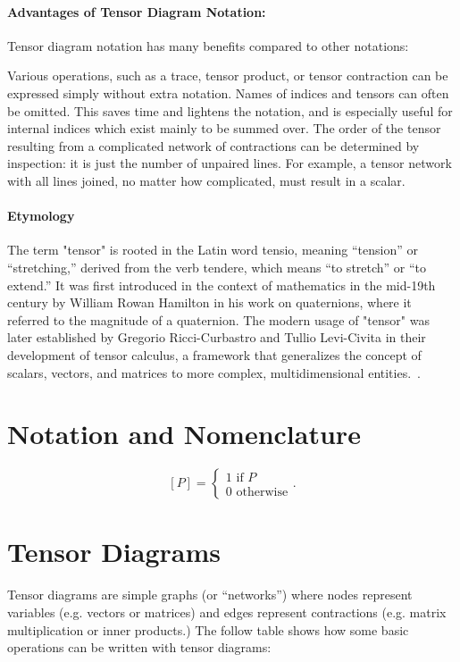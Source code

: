 \paragraph{Advantages of Tensor Diagram Notation:}
Tensor diagram notation has many benefits compared to other notations:

Various operations, such as a trace, tensor product, or tensor contraction can be expressed simply without extra notation.
Names of indices and tensors can often be omitted. This saves time and lightens the notation, and is especially useful for internal indices which exist mainly to be summed over.
The order of the tensor resulting from a complicated network of contractions can be determined by inspection: it is just the number of unpaired lines. For example, a tensor network with all lines joined, no matter how complicated, must result in a scalar.


\paragraph{Etymology}
The term "tensor" is rooted in the Latin word tensio, meaning ``tension'' or ``stretching,'' derived from the verb tendere, which means ``to stretch'' or ``to extend.''
It was first introduced in the context of mathematics in the mid-19th century by William Rowan Hamilton in his work on quaternions, where it referred to the magnitude of a quaternion.
The modern usage of "tensor" was later established by Gregorio Ricci-Curbastro and Tullio Levi-Civita in their development of tensor calculus, a framework that generalizes the concept of scalars, vectors, and matrices to more complex, multidimensional entities.~\cite{tensor_etymology_russo, hamilton_tensor}.


\tableofcontents
\clearpage

\section{Notation and Nomenclature}
\[
   [P] = \begin{cases}
      1 \text{ if } P \\
      0 \text{ otherwise}
   \end{cases}.
\]

\section{Tensor Diagrams}
Tensor diagrams are simple graphs (or ``networks'') where
nodes represent variables (e.g. vectors or matrices) and edges represent
contractions (e.g. matrix multiplication or inner products.)
The follow table shows how some basic operations can be written with tensor diagrams:

